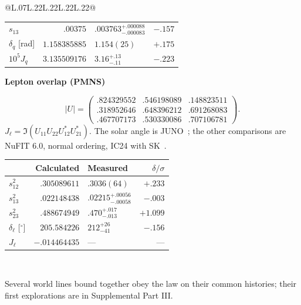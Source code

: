 \documentclass[aps,prx,reprint,longbibliography]{revtex4-2}
\begin{document}
\begin{table}[!t]
\begin{tabular}{@{}L{.07\textwidth}L{.22\textwidth}L{.22\textwidth}L{.22\textwidth}L{.22\textwidth}@{}}
{\begin{minipage}[t]{0.48\textwidth}
\begin{tabular}{@{}lrlr@{}}
$s_{13}$ & $.00375$ & $.003763^{+.000088}_{-.000083}$ & $-.157$\\
$\delta_q$ [rad] & $1.158385885$ & $1.154(25)$ & $+.175$\\
$10^5J_q$ & $3.135509176$ & $3.16^{+.13}_{-.11}$ & $-.223$\\
\bottomrule
\end{tabular}\endgroup
\vspace{5pt}
\end{minipage}\hspace{0.03\textwidth}%
\begin{minipage}[t]{0.48\textwidth}
\vspace{5pt}
\textbf{Lepton overlap (PMNS)}\par
\[
|U|=\begin{pmatrix}
.824329552&.546198089&.148823511\\
.318952646&.648396212&.691268083\\
.467707173&.530330086&.707106781
\end{pmatrix}.
\]
$J_\ell=\Im(U_{11}U_{22}U_{12}^*U_{21}^*)$. The solar angle is JUNO~\cite{JUNO}; the other comparisons are NuFIT 6.0, normal ordering, IC24 with SK~\cite{NuFIT}.\par\smallskip
\begingroup\footnotesize\setlength{\tabcolsep}{2pt}
\begin{tabular}{@{}lrlr@{}}
\toprule
 & Calculated & Measured & $\delta/\sigma$\\
\midrule
$s_{12}^2$ & $.305089611$ & $.3036(64)$ & $+.233$\\
$s_{13}^2$ & $.022148438$ & $.02215^{+.00056}_{-.00058}$ & $-.003$\\
$s_{23}^2$ & $.488674949$ & $.470^{+.017}_{-.013}$ & $+1.099$\\
$\delta_\ell$ [$^\circ$] & $205.584226$ & $212^{+26}_{-41}$ & $-.156$\\
$J_\ell$ & $-.014464435$ & --- & ---\\
\bottomrule
\end{tabular}\endgroup
\vspace{5pt}
\end{minipage}
}\\

\bottomrule
\end{tabular}
\end{table}
\normalsize
\renewcommand{\arraystretch}{1}
\twocolumngrid

Several world lines bound together obey the law on their common histories; their first explorations are in Supplemental Part III.
\end{document}

